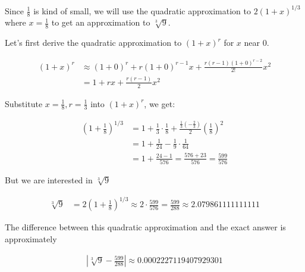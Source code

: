 \documentclass[9pt]{article}
\begin{document}
Since $\frac{1}{8}$ is kind of small, we will use the quadratic approximation to $2(1 + x)^{1/3}$ where $x = \frac{1}{8}$ to get an approximation to $\sqrt[3]9$.

Let's first derive the quadratic approximation to $(1+x)^r$ for $x$ near 0.

\begin{align*}
  (1 + x)^r &\approx (1 + 0)^r + r(1 + 0)^{r-1}x + \frac{r(r-1)(1+0)^{r-2}}{2!}x^2 \\
            &= 1 + rx + \frac{r(r-1)}{2}x^2
\end{align*}

Substitute $x = \frac{1}{8}, r = \frac{1}{3}$ into $(1 + x)^r$, we get:

\begin{align*}
  (1 + \frac{1}{8})^{1/3} &= 1 + \frac{1}{3} \cdot \frac{1}{8} + \frac{\frac{1}{3}(-\frac{2}{3})}{2}(\frac{1}{8})^2 \\
                          &= 1 + \frac{1}{24} - \frac{1}{9} \cdot \frac{1}{64} \\
                          &= 1 + \frac{24 - 1}{576} = \frac{576 + 23}{576} = \frac{599}{576}
\end{align*}

But we are interested in $\sqrt[3]9$

\begin{align*}
  \sqrt[3]9 &= 2(1 + \frac{1}{8})^{1/3} \approx 2 \cdot \frac{599}{576} = \frac{599}{288} \approx 2.079861111111111
\end{align*}

The difference between this quadratic approximation and the exact answer is approximately

\begin{align*}
  |\sqrt[3]9 - \frac{599}{288}| \approx 0.0002227119407929301
\end{align*}
\end{document}
